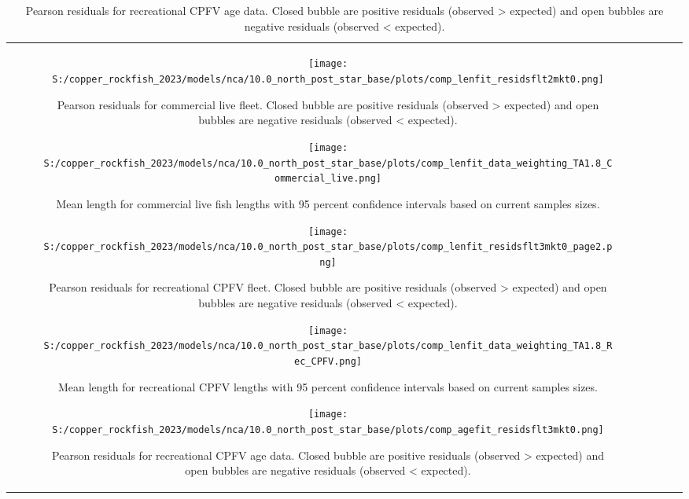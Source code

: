 \documentclass[11pt,
  letterpaper,
]{article}
\begin{document}
\begin{longtable}[t]{c>{\centering\arraybackslash}p{2cm}>{\centering\arraybackslash}p{2cm}>{\centering\arraybackslash}p{2cm}}
\pagebreak

\begin{figure}
{\centering
\texttt{[image: S:/copper\_rockfish\_2023/models/nca/10.0\_north\_post\_star\_base/plots/comp\_lenfit\_residsflt2mkt0.png]}
}
\caption{Pearson residuals for commercial live fleet. Closed bubble are positive residuals (observed > expected) and open bubbles are negative residuals (observed < expected).\label{fig:com-live-pearson}}
\end{figure}

\pagebreak

\begin{figure}
{\centering
\texttt{[image: S:/copper\_rockfish\_2023/models/nca/10.0\_north\_post\_star\_base/plots/comp\_lenfit\_data\_weighting\_TA1.8\_Commercial\_live.png]}
}
\caption{Mean length for commercial live fish lengths with 95 percent confidence intervals based on current samples sizes.\label{fig:com-live-mean-len-fit}}
\end{figure}

\pagebreak

\begin{figure}
{\centering
\texttt{[image: S:/copper\_rockfish\_2023/models/nca/10.0\_north\_post\_star\_base/plots/comp\_lenfit\_residsflt3mkt0\_page2.png]}
}
\caption{Pearson residuals for recreational CPFV fleet. Closed bubble are positive residuals (observed > expected) and open bubbles are negative residuals (observed < expected).\label{fig:rec-cpfv-pearson}}
\end{figure}

\pagebreak

\begin{figure}
{\centering
\texttt{[image: S:/copper\_rockfish\_2023/models/nca/10.0\_north\_post\_star\_base/plots/comp\_lenfit\_data\_weighting\_TA1.8\_Rec\_CPFV.png]}
}
\caption{Mean length for recreational CPFV lengths with 95 percent confidence intervals based on current samples sizes.\label{fig:rec-cpfv-mean-len-fit}}
\end{figure}

\pagebreak

\begin{figure}
{\centering
\texttt{[image: S:/copper\_rockfish\_2023/models/nca/10.0\_north\_post\_star\_base/plots/comp\_agefit\_residsflt3mkt0.png]}
}
\caption{Pearson residuals for recreational CPFV age data. Closed bubble are positive residuals (observed > expected) and open bubbles are negative residuals (observed < expected).\label{fig:rec-cpfv-age-pearson}}
\end{figure}


\end{longtable}
\end{document}
